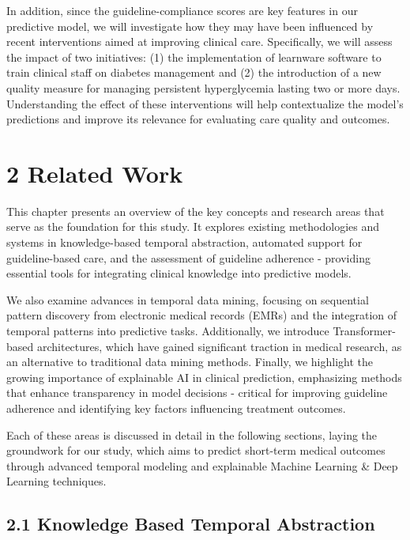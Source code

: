 \documentclass[
]{article}
\begin{document}
In addition, since the guideline-compliance scores are key features in
our predictive model, we will investigate how they may have been
influenced by recent interventions aimed at improving clinical care.
Specifically, we will assess the impact of two initiatives: (1) the
implementation of learnware software to train clinical staff on diabetes
management and (2) the introduction of a new quality measure for
managing persistent hyperglycemia lasting two or more days.
Understanding the effect of these interventions will help contextualize
the model's predictions and improve its relevance for evaluating care
quality and outcomes.

\section{2 Related Work}\label{related-work}

This chapter presents an overview of the key concepts and research areas
that serve as the foundation for this study. It explores existing
methodologies and systems in knowledge-based temporal abstraction,
automated support for guideline-based care, and the assessment of
guideline adherence - providing essential tools for integrating clinical
knowledge into predictive models.

We also examine advances in temporal data mining, focusing on sequential
pattern discovery from electronic medical records (EMRs) and the
integration of temporal patterns into predictive tasks. Additionally, we
introduce Transformer-based architectures, which have gained significant
traction in medical research, as an alternative to traditional data
mining methods. Finally, we highlight the growing importance of
explainable AI in clinical prediction, emphasizing methods that enhance
transparency in model decisions - critical for improving guideline
adherence and identifying key factors influencing treatment outcomes.

Each of these areas is discussed in detail in the following sections,
laying the groundwork for our study, which aims to predict short-term
medical outcomes through advanced temporal modeling and explainable
Machine Learning \& Deep Learning techniques.

\subsection{2.1 Knowledge Based Temporal
Abstraction}\label{knowledge-based-temporal-abstraction}
\end{document}
